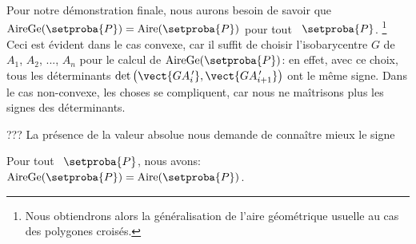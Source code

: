     


Pour notre démonstration finale, nous aurons besoin de savoir que $\garea{\setproba{P}} = \area{\setproba{P}}$ pour tout \ngone\ $\setproba{P}$.%
\footnote{
	Nous obtiendrons alors la généralisation de l'aire géométrique usuelle au cas des polygones croisés.
}
Ceci est évident dans le cas convexe, car il suffit de choisir l'isobarycentre $G$ de $A_1$, $A_2$, ..., $A_n$ pour le calcul de $\garea{\setproba{P}}$: en effet, avec ce choix, tous les déterminants $\det \big( \vect{G A^{\,\prime}_i} , \vect{G A^{\,\prime}_{i+1}} \big)$ ont le même signe.
Dans le cas non-convexe, les choses se compliquent, car nous ne maîtrisons plus les signes des déterminants. 



???
La présence de la valeur absolue nous demande de connaître mieux le signe

    
    


\begin{fact}
    Pour tout \ngone\ $\setproba{P}$, nous avons: $\garea{\setproba{P}} = \area{\setproba{P}}$.
\end{fact}


